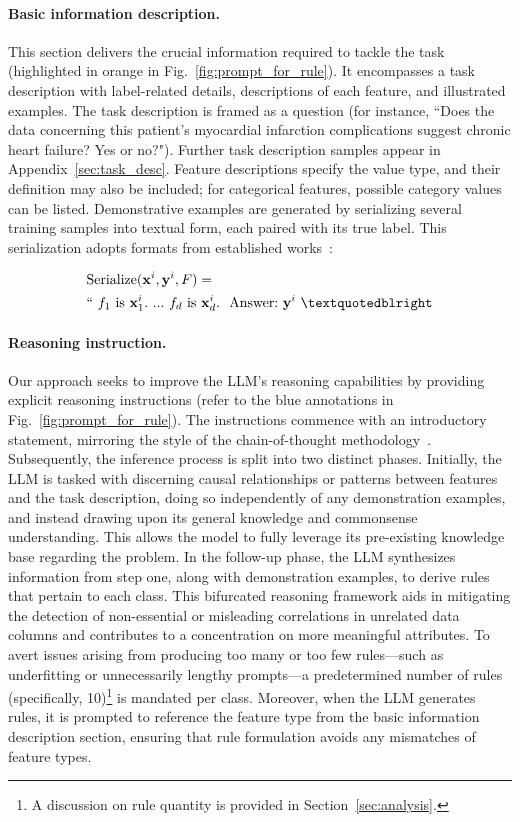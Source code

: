 \paragraph{Basic information description.} This section delivers the crucial information required to tackle the task (highlighted in orange in Fig.~\ref{fig:prompt_for_rule}). It encompasses a task description with label-related details, descriptions of each feature, and illustrated examples. The task description is framed as a question (for instance, ``Does the data concerning this patient's myocardial infarction complications suggest chronic heart failure? Yes or no?"). Further task description samples appear in Appendix~\ref{sec:task_desc}. Feature descriptions specify the value type, and their definition may also be included; for categorical features, possible category values can be listed. Demonstrative examples are generated by serializing several training samples into textual form, each paired with its true label. This serialization adopts formats from established works~\cite{dinh2022lift,hegselmann2023tabllm}:

\begin{align}
&\text{Serialize}(\mathbf{x}^i,\mathbf{y}^i, F) = \nonumber \\ 
&``\ f_1\ \text{is}\ \mathbf{x}^i_1.\ ... \ f_d\  \text{is}\  \mathbf{x}^i_d.\ \ \text{Answer:}\  \mathbf{y}^i\ ”
\end{align}

\vspace*{-0.12in}
\paragraph{Reasoning instruction.} Our approach seeks to improve the LLM’s reasoning capabilities by providing explicit reasoning instructions (refer to the blue annotations in Fig.~\ref{fig:prompt_for_rule}). The instructions commence with an introductory statement, mirroring the style of the chain-of-thought methodology~\cite{wei2022chain}. Subsequently, the inference process is split into two distinct phases. Initially, the LLM is tasked with discerning causal relationships or patterns between features and the task description, doing so independently of any demonstration examples, and instead drawing upon its general knowledge and commonsense understanding. This allows the model to fully leverage its pre-existing knowledge base regarding the problem. In the follow-up phase, the LLM synthesizes information from step one, along with demonstration examples, to derive rules that pertain to each class. This bifurcated reasoning framework aids in mitigating the detection of non-essential or misleading correlations in unrelated data columns and contributes to a concentration on more meaningful attributes. To avert issues arising from producing too many or too few rules—such as underfitting or unnecessarily lengthy prompts—a predetermined number of rules (specifically, 10)\footnote{A discussion on rule quantity is provided in Section~\ref{sec:analysis}.} is mandated per class. Moreover, when the LLM generates rules, it is prompted to reference the feature type from the basic information description section, ensuring that rule formulation avoids any mismatches of feature types.

